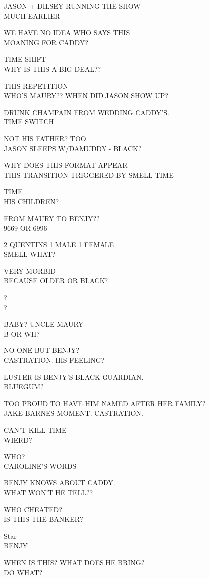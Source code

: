 \documentclass[10pt,letterpaper]{article}
\begin{document}
JASON + DILSEY RUNNING THE SHOW\\
MUCH EARLIER

WE HAVE NO IDEA WHO SAYS THIS\\
MOANING FOR CADDY?

TIME SHIFT\\
WHY IS THIS A BIG DEAL??

THIS REPETITION\\
WHO'S MAURY?? WHEN DID JASON SHOW UP?

DRUNK CHAMPAIN FROM WEDDING CADDY'S.\\
TIME SWITCH

NOT HIS FATHER? TOO\\
JASON SLEEPS W/DAMUDDY {-} BLACK?

WHY DOES THIS FORMAT APPEAR\\
THIS TRANSITION TRIGGERED BY SMELL TIME

TIME\\
HIS CHILDREN?

FROM MAURY TO BENJY??\\
9669 OR 6996

2 QUENTINS 1 MALE 1 FEMALE\\
SMELL WHAT?

VERY MORBID\\
BECAUSE OLDER OR BLACK?

?\\
?

BABY? UNCLE MAURY\\
B OR WH?

NO ONE BUT BENJY?\\
CASTRATION. HIS FEELING?

LUSTER IS BENJY'S BLACK GUARDIAN.\\
BLUEGUM?

TOO PROUD TO HAVE HIM NAMED AFTER HER FAMILY?\\
JAKE BARNES MOMENT. CASTRATION.

CAN'T KILL TIME\\
WIERD?

WHO?\\
CAROLINE'S WORDS

BENJY KNOWS ABOUT CADDY.\\
WHAT WON'T HE TELL??

WHO CHEATED?\\
IS THIS THE BANKER?

Star\\
BENJY

WHEN IS THIS? WHAT DOES HE BRING?\\
DO WHAT?
\end{document}
